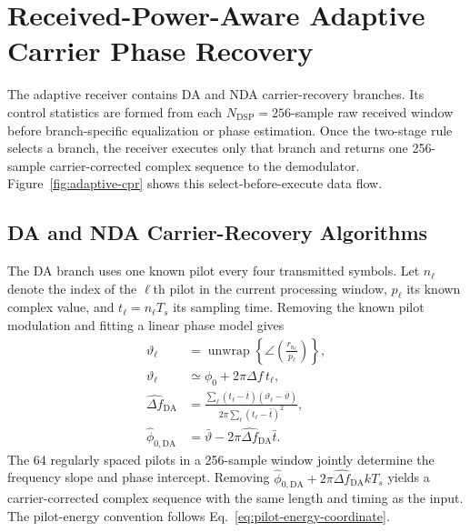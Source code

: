 \section{Received-Power-Aware Adaptive Carrier Phase Recovery}
\label{sec:method}

The adaptive receiver contains DA and NDA carrier-recovery branches. Its control statistics are formed from each $N_{\mathrm{DSP}}=256$-sample raw received window before branch-specific equalization or phase estimation. Once the two-stage rule selects a branch, the receiver executes only that branch and returns one 256-sample carrier-corrected complex sequence to the demodulator. Figure~\ref{fig:adaptive-cpr} shows this select-before-execute data flow.

\subsection{DA and NDA Carrier-Recovery Algorithms}

The DA branch uses one known pilot every four transmitted symbols. Let $n_\ell$ denote the index of the $\ell$th pilot in the current processing window, $p_\ell$ its known complex value, and $t_\ell=n_\ell T_s$ its sampling time. Removing the known pilot modulation and fitting a linear phase model gives
\begin{equation}
\begin{aligned}
\vartheta_\ell
&=\operatorname{unwrap}\!\left\{\angle\!\left(\frac{r_{n_\ell}}{p_\ell}\right)\right\},\\
\vartheta_\ell
&\simeq\phi_0+2\pi\Delta f\,t_\ell,\\
\widehat{\Delta f}_{\mathrm{DA}}
&=\frac{\sum_\ell(t_\ell-\bar t)(\vartheta_\ell-\bar\vartheta)}
{2\pi\sum_\ell(t_\ell-\bar t)^2},\\
\hat\phi_{0,\mathrm{DA}}
&=\bar\vartheta-2\pi\widehat{\Delta f}_{\mathrm{DA}}\bar t .
\end{aligned}
\label{eq:da-phase-time-ls}
\end{equation}
The 64 regularly spaced pilots in a 256-sample window jointly determine the frequency slope and phase intercept. Removing $\hat\phi_{0,\mathrm{DA}}+2\pi\widehat{\Delta f}_{\mathrm{DA}}kT_s$ yields a carrier-corrected complex sequence with the same length and timing as the input. The pilot-energy convention follows Eq.~\eqref{eq:pilot-energy-coordinate}.

